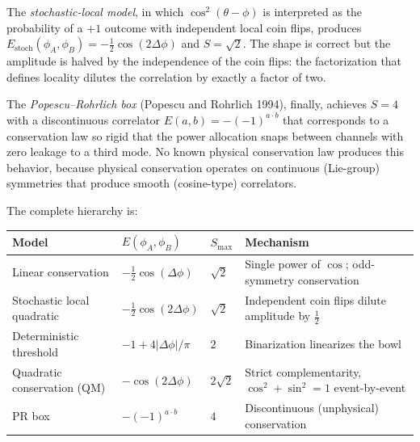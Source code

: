 \documentclass[
  11pt]{article}
\begin{document}
The \emph{stochastic-local model}, in which \(\cos^2(\theta - \phi)\) is
interpreted as the probability of a \(+1\) outcome with independent
local coin flips, produces
\(E_\text{stoch}(\phi_A, \phi_B) = -\tfrac{1}{2}\cos(2\Delta\phi)\) and
\(S = \sqrt{2}\). The shape is correct but the amplitude is halved by
the independence of the coin flips: the factorization that defines
locality dilutes the correlation by exactly a factor of two.

The \emph{Popescu--Rohrlich box} (Popescu and Rohrlich 1994), finally,
achieves \(S = 4\) with a discontinuous correlator
\(E(a,b) = -(-1)^{a \cdot b}\) that corresponds to a conservation law so
rigid that the power allocation snaps between channels with zero leakage
to a third mode. No known physical conservation law produces this
behavior, because physical conservation operates on continuous
(Lie-group) symmetries that produce smooth (cosine-type) correlators.

The complete hierarchy is:

\begin{longtable}[]{@{}
  >{\raggedright\arraybackslash}p{}
  >{\raggedright\arraybackslash}p{}
  >{\raggedright\arraybackslash}p{}
  >{\raggedright\arraybackslash}p{}@{}}
\toprule\noalign{}
\begin{minipage}[b]{\linewidth}\raggedright
Model
\end{minipage} & \begin{minipage}[b]{\linewidth}\raggedright
\(E(\phi_A, \phi_B)\)
\end{minipage} & \begin{minipage}[b]{\linewidth}\raggedright
\(S_{\max}\)
\end{minipage} & \begin{minipage}[b]{\linewidth}\raggedright
Mechanism
\end{minipage} \\
\midrule\noalign{}
\endhead
\bottomrule\noalign{}
\endlastfoot
Linear conservation & \(-\tfrac{1}{2}\cos(\Delta\phi)\) & \(\sqrt{2}\) &
Single power of \(\cos\); odd-symmetry conservation \\
Stochastic local quadratic & \(-\tfrac{1}{2}\cos(2\Delta\phi)\) &
\(\sqrt{2}\) & Independent coin flips dilute amplitude by
\(\tfrac{1}{2}\) \\
Deterministic threshold & \(-1 + 4\lvert\Delta\phi\rvert/\pi\) & \(2\) &
Binarization linearizes the bowl \\
Quadratic conservation (QM) & \(-\cos(2\Delta\phi)\) & \(2\sqrt{2}\) &
Strict complementarity, \(\cos^2 + \sin^2 = 1\) event-by-event \\
PR box & \(-(-1)^{a \cdot b}\) & \(4\) & Discontinuous (unphysical)
conservation \\
\end{longtable}
\end{document}

